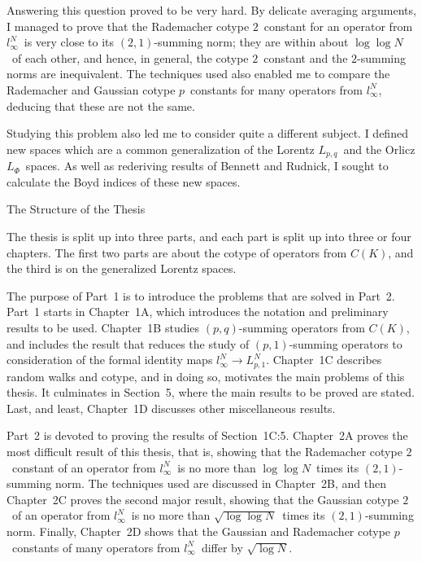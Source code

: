 Answering this question proved to be very hard. By delicate averaging
arguments, I managed to prove that the Rademacher cotype $2$\ constant
for an
operator from $l_\infty^N$\ is very close to its $(2,1)$-summing
norm; they
are within about $\log\log N$\ of each other, and hence, in general,
the
cotype $2$\ constant and the $2$-summing norms are inequivalent.
The
techniques used also enabled me to compare the Rademacher and Gaussian
cotype
$p$\
constants for many operators from $l_\infty^N$, deducing that these
are not
the same.
 
Studying this problem also led me to consider quite a different subject.
I
defined new spaces which are a common generalization of the Lorentz
$L_{p,q}$\
and the Orlicz $L_\Phi$\ spaces. As well as rederiving results of
Bennett and
Rudnick, I sought to calculate the Boyd indices of these new spaces.
 
\beginsection The Structure of the Thesis
 
The thesis is split up into three parts, and each part is split up
into three
or four chapters. The first two parts are about the cotype of operators
from
$C(K)$, and the third is on the generalized Lorentz spaces.
 
The purpose of Part~1 is to introduce the problems that are solved
in Part~2.
Part~1 starts in Chapter~1A, which introduces the notation and preliminary
results to be used. Chapter~1B studies $(p,q)$-summing operators
from $C(K)$,
and includes the result that reduces the study of $(p,1)$-summing
operators to
consideration of the formal identity maps $l_\infty^N \to L_{p,1}^N$.
Chapter~1C describes random walks and cotype, and in doing so, motivates
the
main problems of this thesis. It culminates in Section~5, where the
main
results to be proved are stated. Last, and least, Chapter~1D discusses
other
miscellaneous results.
 
Part~2 is devoted to proving the results of Section~1C:5. Chapter~2A
proves the
most difficult result of this thesis, that is, showing that the Rademacher
cotype $2$\ constant of an operator from $l_\infty^N$\ is no more
than $\log\log
N$\ times its $(2,1)$-summing norm. The techniques used are discussed
in
Chapter~2B, and then Chapter~2C proves the second major result, showing
that
the Gaussian cotype $2$\ of an operator from $l_\infty^N$\ is no
more than
$\sqrt{\log\log N}$\ times its $(2,1)$-summing norm. Finally, Chapter~2D
shows
that the Gaussian and Rademacher cotype $p$\ constants of many operators
from
$l_\infty^N$\ differ by $\sqrt{\log N}$.
 
